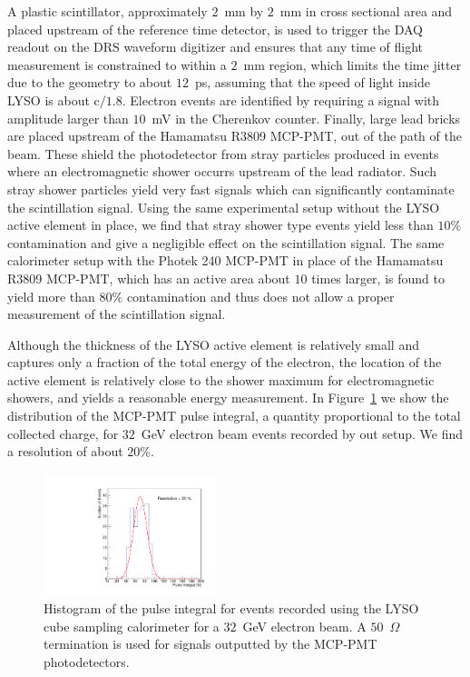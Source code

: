 \documentclass[12pt]{article}
\begin{document}
A plastic scintillator, approximately $2$~mm by $2$~mm in cross sectional area
and placed upstream of the reference time detector, is used to trigger
the DAQ readout on the DRS waveform digitizer and ensures that any
time of flight measurement is constrained to within a $2$~mm region,
which limits the time jitter due to the geometry to about $12$~ps, 
assuming that the speed of light inside LYSO is about $\mathrm{c}/1.8$.
Electron events are identified by requiring a signal with amplitude
larger than $10$~mV in the Cherenkov counter.
Finally, large lead bricks are placed upstream of the Hamamatsu
R3809 MCP-PMT, out of the path of the beam. These shield the photodetector
from stray particles produced in events where an electromagnetic shower
occurrs upstream of the lead radiator. Such stray shower
particles yield very fast signals which can significantly contaminate the
scintillation signal. Using the same experimental setup without the 
LYSO active element in place, we find that stray shower type events yield 
less than $10\%$ contamination and give a negligible effect on the scintillation 
signal. The same calorimeter setup with the Photek 240 MCP-PMT in place of the 
Hamamatsu R3809 MCP-PMT, which has an active area about $10$ times larger, 
is found to yield more than $80\%$ contamination and thus does not allow a proper
measurement of the scintillation signal.

Although the thickness of the LYSO active element is relatively
small and captures only a fraction of the total energy
of the electron, the location of the active element is relatively close to the
shower maximum for electromagnetic showers, and yields
a reasonable energy measurement. In Figure~\ref{fig:LYSOCubeEnergy32GeV}
we show the distribution of the MCP-PMT pulse integral, a quantity
proportional to the total collected charge, for $32$~GeV electron beam
events recorded by out setup. We find a resolution of about $20\%$.


\begin{figure}[h] \centering
\includegraphics[width=0.45\textwidth]{figs/TOF_Electron_LYSOCube_32GeV_energy} 
\caption{ Histogram of the pulse integral for events recorded using
the LYSO cube sampling calorimeter for a $32$~GeV electron beam. A
$50$~$\Omega$ termination is used for signals outputted by the MCP-PMT
photodetectors. } 
\label{fig:LYSOCubeEnergy32GeV}
\end{figure}
\end{document}

